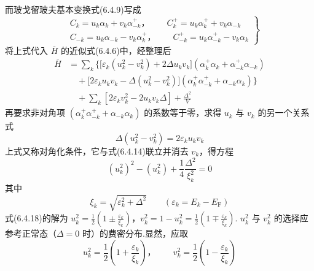 而玻戈留玻夫基本变换式(6.4.9)写成
\begin{equation}
  \left.
  \begin{aligned}
    &C_{k}=u_{k}\alpha_{k}+v_{k}\alpha^{+}_{-k}\text{，}
    \qquad C^{+}_{k}=u_{k}\alpha^{+}_{k}+v_{k}\alpha_{-k}\\
    &C_{-k}=u_{k}\alpha_{-k}-v_{k}\alpha^{+}_{k}\text{，}
    \qquad C^{+}_{-k}=u_{k}\alpha^{+}_{-k}-v_{k}\alpha_{k}
  \end{aligned}\right\}
\end{equation}
将上式代入 $\overline{H}$ 的近似式(6.4.6)中，经整理后
\begin{equation}
\begin{aligned}
  \overline{H}&=\sum_{k}\bigl\{\bigl[\varepsilon_{k}(u_{k}^{2}-v_{k}^{2})
  +2\Delta u_{k}v_{k}\bigr]\left(\alpha^{+}_{k}\alpha_{k}
  +\alpha^{+}_{-k}\alpha_{-k}\right)\\
  &\quad+\bigl[2\varepsilon_{k}u_{k}v_{k}
  -\Delta\left(u_{k}^{2}-v_{k}^{2}\right)\bigr]
  \left(\alpha^{+}_{k}\alpha^{+}_{-k}
  +\alpha_{-k}\alpha_{k}\right)\bigr\}\\
  &\quad+\sum_{k}\left[2\varepsilon_{k}v_{k}^{2}-2u_{k}v_{k}\Delta\right]
  +\frac{\Delta^{2}}{V}
\end{aligned}
\end{equation}
再要求非对角项 $\left(\alpha^{+}_{k}\alpha^{+}_{-k}
+\alpha_{-k}\alpha_{k}\right)$ 的系数等于零，求得 $u_{k}$ 与 $v_{k}$ 的另一个关系式
\begin{equation}
  \Delta\left(u_{k}^{2}-v_{k}^{2}\right)=2\varepsilon_{k}u_{k}v_{k}
\end{equation}
上式又称对角化条件，它与式(6.4.14)联立并消去 $v_{k}$，得方程
\begin{equation}
  \left(u_{k}^{2}\right)^{2}-\left(u_{k}^{2}\right)
  +\frac{1}{4}\frac{\Delta^{2}}{\xi_{k}^{2}}=0
\end{equation}
其中
\begin{equation}
  \xi_{k}=\sqrt{\varepsilon_{k}^{2}+\Delta^{2}}
  \qquad\left(\varepsilon_{k}=E_{k}-E_{\mathrm{F}}\right)
\end{equation}
式(6.4.18)的解为 $u_{k}^{2}=\frac{1}{2}\left(1\pm\frac{\varepsilon_{k}}{\xi_{k}}\right)$，$v_{k}^{2}=1-u_{k}^{2}=\frac{1}{2}\left(1\mp\frac{\varepsilon_{k}}{\xi_{k}}\right)$. $u_{k}^{2}$ 与 $v_{k}^{2}$ 的选择应参考正常态（$\Delta=0$ 时）的费密分布.显然，应取
\begin{equation}
  u_{k}^{2}=\frac{1}{2}\left(1+\frac{\varepsilon_{k}}{\xi_{k}}\right)\text{，}\qquad
  v_{k}^{2}=\frac{1}{2}\left(1-\frac{\varepsilon_{k}}{\xi_{k}}\right)
\end{equation}
